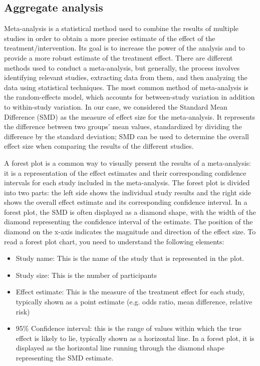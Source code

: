 \subsection{Aggregate analysis}
Meta-analysis is a statistical method used to combine the results of multiple studies in order to obtain a more precise estimate of the effect of the treatment/intervention. Its goal is to increase the power of the analysis and to provide a more robust estimate of the treatment effect.
There are different methods used to conduct a meta-analysis, but generally, the process involves identifying relevant studies, extracting data from them, and then analyzing the data using statistical techniques. The most common method of meta-analysis is the random-effects model, which accounts for between-study variation in addition to within-study variation.
In our case, we considered the Standard Mean Difference (SMD) as the measure of effect size for the meta-analysis. It represents the difference between two groups' mean values, standardized by dividing the difference by the standard deviation; SMD can be used to determine the overall effect size when comparing the results of the different studies. 

A forest plot is a common way to visually present the results of a meta-analysis: it is a representation of the effect estimates and their corresponding confidence intervals for each study included in the meta-analysis. The forest plot is divided into two parts: the left side shows the individual study results and the right side shows the overall effect estimate and its corresponding confidence interval.
In a forest plot, the SMD is often displayed as a diamond shape, with the width of the diamond representing the confidence interval of the estimate. The position of the diamond on the x-axis indicates the magnitude and direction of the effect size.
To read a forest plot chart, you need to understand the following elements:
\begin{itemize}
    \item Study name: This is the name of the study that is represented in the plot.
    \item Study size: This is the number of participants
    \item Effect estimate: This is the measure of the treatment effect for each study, typically shown as a point estimate (e.g. odds ratio, mean difference, relative risk)
    \item 95\% Confidence interval: this is the range of values within which the true effect is likely to lie, typically shown as a horizontal line. In a forest plot, it is  displayed as the horizontal line running through the diamond shape representing the SMD estimate.
\end{itemize}

